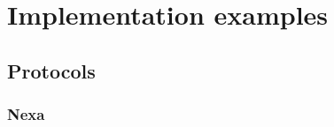 \documentclass[letterpaper,10pt,english]{sphinxmanual}
\begin{document}
\begin{fulllineitems}
\label{api/scenario:scenario.Constant}
\end{fulllineitems}


\begin{fulllineitems}
\label{api/scenario:scenario.Not}
\end{fulllineitems}


\begin{fulllineitems}
\label{api/scenario:scenario.And}
\end{fulllineitems}


\begin{fulllineitems}
\label{api/scenario:scenario.Or}
\end{fulllineitems}


\begin{fulllineitems}
\label{api/scenario:scenario.Multiply}
\end{fulllineitems}



\chapter{Implementation examples}
\label{implementation_examples::doc}\label{implementation_examples:implementation-examples}

\section{Protocols}
\label{implementation_examples:protocols}

\subsection{Nexa}
\label{implementation_examples:nexa}
\end{document}
